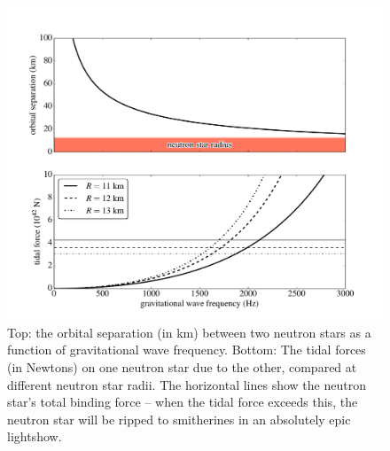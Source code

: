 \documentclass[11pt]{article}
\begin{document}
\begin{figure}
\centering
\includegraphics[scale=0.5]{newtonian_tidal_forces.pdf}
\caption{\label{fig:NS_tides}Top: the orbital separation (in km) between two neutron stars as a function of gravitational wave frequency. Bottom: The tidal forces (in Newtons) on one neutron star due to the other, compared at different neutron star radii. The horizontal lines show the neutron star's total binding force -- when the tidal force exceeds this, the neutron star will be ripped to smitherines in an absolutely epic lightshow.}
\end{figure}
\end{document}
